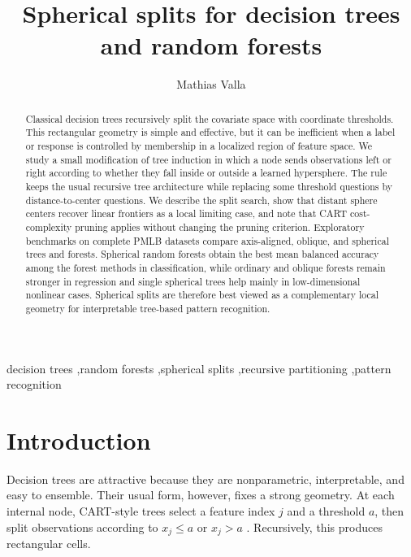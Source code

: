 \documentclass[final,5p,times,twocolumn]{elsarticle}
\begin{document}
\begin{frontmatter}

\title{Spherical splits for decision trees and random forests}

\author[inst1]{Mathias Valla}


\begin{abstract}
Classical decision trees recursively split the covariate space with coordinate
thresholds. This rectangular geometry is simple and effective, but it can be
inefficient when a label or response is controlled by membership in a localized
region of feature space. We study a small modification of tree induction in
which a node sends observations left or right according to whether they fall
inside or outside a learned hypersphere. The rule keeps the usual recursive
tree architecture while replacing some threshold questions by
distance-to-center questions. We describe the split search, show that distant
sphere centers recover linear frontiers as a local limiting case, and note that
CART cost-complexity pruning applies without changing the pruning criterion.
Exploratory benchmarks on complete PMLB datasets compare axis-aligned, oblique,
and spherical trees and forests. Spherical random forests obtain the best mean
balanced accuracy among the forest methods in classification, while ordinary
and oblique forests remain stronger in regression and single spherical trees
help mainly in low-dimensional nonlinear cases. Spherical splits are therefore
best viewed as a complementary local geometry for interpretable tree-based
pattern recognition.
\end{abstract}

\begin{keyword}
decision trees \sep random forests \sep spherical splits \sep recursive partitioning \sep pattern recognition
\end{keyword}

\end{frontmatter}

\section{Introduction}

Decision trees are attractive because they are nonparametric, interpretable,
and easy to ensemble. Their usual form, however, fixes a strong geometry. At
each internal node, CART-style trees select a feature index $j$ and a threshold
$a$, then split observations according to $x_j \le a$ or $x_j>a$
\cite{breiman1984cart}. Recursively, this produces rectangular cells.
\end{document}
